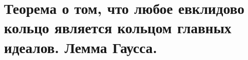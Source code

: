 \section{
    Теорема о том, что любое евклидово кольцо является кольцом главных идеалов. Лемма Гаусса.
}



